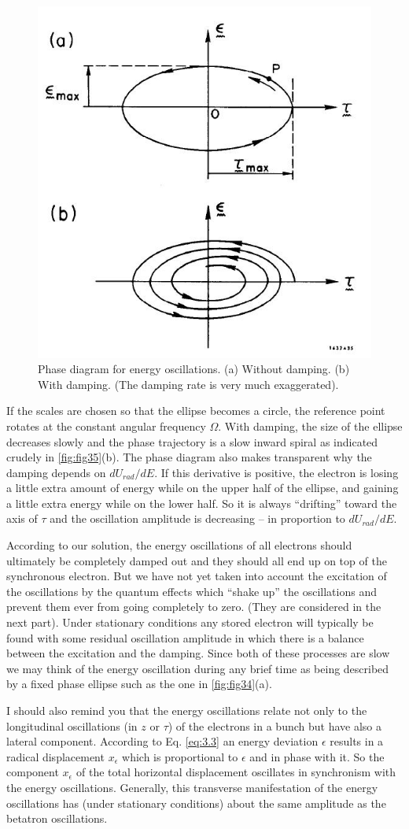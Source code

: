 \begin{figure}[!htb]
	\centering
	\includegraphics[width=0.6\linewidth]{./Figuras/fig35.jpeg}
	\caption{Phase diagram for energy oscillations. (a) Without damping. (b) With damping. (The damping rate is very much exaggerated).}
	\label{fig:fig35}
\end{figure}

If the scales are chosen so that the ellipse becomes a circle, the reference point rotates at the constant angular frequency $\Omega$. With damping, the size of the ellipse decreases slowly and the phase trajectory is a slow inward spiral as indicated crudely in \autoref{fig:fig35}(b). The phase diagram also makes transparent why the damping depends on $dU_{rad}/dE$. If this derivative is positive, the electron is losing a little extra amount of energy while on the upper half of the ellipse, and gaining a little extra energy while on the lower half. So it is always “drifting” toward the axis of $\tau$ and the oscillation amplitude is decreasing -- in proportion to $dU_{rad}/dE$.

According to our solution, the energy oscillations of all electrons should ultimately be completely damped out and they should all end up on top of the synchronous electron. But we have not yet taken into account the excitation of the oscillations by the quantum effects which “shake up” the oscillations and prevent them ever from going completely to zero. (They are considered in the next part). Under stationary conditions any stored electron will typically be found with some residual oscillation amplitude in which there is a balance between the excitation and the damping. Since both of these processes are slow we may think of the energy oscillation during any brief time as being described by a fixed phase ellipse such as the one in \autoref{fig:fig34}(a).

I should also remind you that the energy oscillations relate not only to the longitudinal oscillations (in $z$ or $\tau$) of the electrons in a bunch but have also a lateral component. According to Eq. \eqref{eq:3.3} an energy deviation $\epsilon$ results in a radical displacement $x_\epsilon$ which is proportional to $\epsilon$ and in phase with it. So the component $x_\epsilon$ of the total horizontal displacement oscillates in synchronism with the energy oscillations. Generally, this transverse manifestation of the energy oscillations has (under stationary conditions) about the same amplitude as the betatron oscillations.
